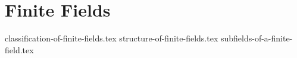 \chapter{Finite Fields}
{classification-of-finite-fields.tex}
{structure-of-finite-fields.tex}
{subfields-of-a-finite-field.tex}
